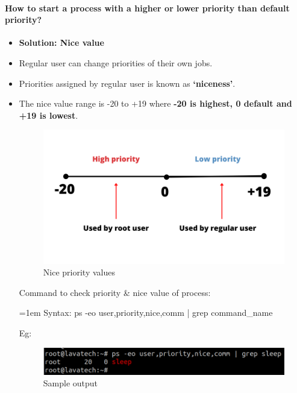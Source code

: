 \begin{flushleft}
\newpage

\paragraph{How to start a process with a higher or lower priority than default priority?}
\begin{itemize}
	\item \textbf{Solution: Nice value}
	\item Regular user can change priorities of their own jobs.
	\item Priorities assigned by regular user is known as \textbf{‘niceness’}.
	\item The nice value range is -20 to +19 where \textbf{-20 is highest, 0 default and +19 is lowest}.
	\begin{figure}[h!]
		\centering
		\includegraphics[scale=.5]{content/chapter12/images/nice.png}
		\caption{Nice priority values}
		\label{fig:cpu58}
	\end{figure}
	
	Command to check priority \& nice value of process:
	\bigskip
	\begin{tcolorbox}[breakable,notitle,boxrule=-0pt,colback=pink,colframe=pink]
		\color{black}
		\font=1em
		Syntax: ps -eo user,priority,nice,comm | grep command\_name
		\font=4pt
	\end{tcolorbox}	
	
	Eg:
	\begin{figure}[h!]
		\centering
		\includegraphics[scale=.4]{content/chapter12/images/ps_nice.png}
		\caption{Sample output}
		\label{fig:cpu589}
	\end{figure}
	\newpage


\end{itemize}
\end{flushleft}
